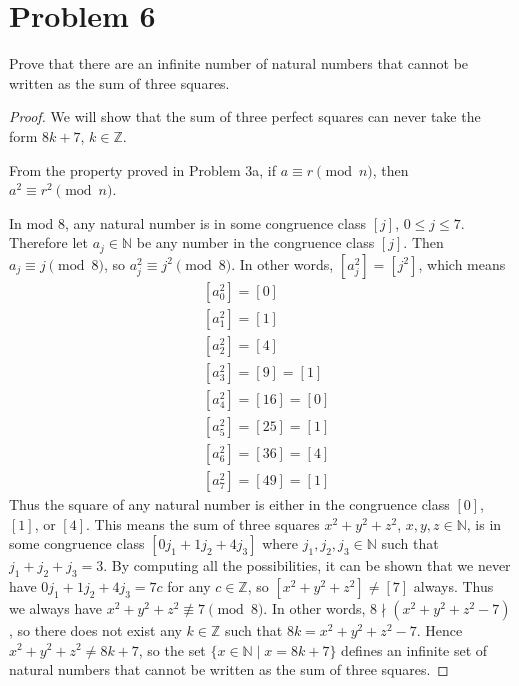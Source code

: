 \documentclass[12pt]{article}
\newcommand{\Z}{\mathbb{Z}}
\theoremstyle{definition}
\begin{document}
\section*{Problem 6}
Prove that there are an infinite number of natural numbers that cannot be written as the sum of
three squares.

\begin{proof}
We will show that the sum of three perfect squares can never take the form \(8k+7\), \(k\in\Z\).

From the property proved in Problem \(3\)a, if \(a\equiv r\pmod{n}\), then \(a^2\equiv r^2\pmod{n}\).

In mod \(8\), any natural number is in some congruence class \([j]\), \(0\leq j\leq 7\). Therefore let \(a_j\in\mathbb{N}\) be any number in the congruence class \([j]\). Then \(a_j\equiv j\pmod{8}\), so \(a_j^2\equiv j^2\pmod{8}\). In other words, \([a_j^2] = [j^2]\), which means
\begin{align*}
    &[a_0^2] = [0]\\
    &[a_1^2] = [1]\\
    &[a_2^2] = [4]\\
    &[a_3^2] = [9] = [1]\\
    &[a_4^2] = [16] = [0]\\
    &[a_5^2] = [25] = [1]\\
    &[a_6^2] = [36] = [4]\\
    &[a_7^2] = [49] = [1]
\end{align*}
Thus the square of any natural number is either in the congruence class \([0]\), \([1]\), or \([4]\). This means the sum of three squares \(x^2 + y^2 + z^2\), \(x,y,z\in\mathbb{N}\), is in some congruence class \([0j_1 + 1j_2 + 4j_3]\) where \(j_1, j_2, j_3\in\mathbb{N}\) such that \(j_1 + j_2 + j_3 = 3\). By computing all the possibilities, it can be shown that we never have \(0j_1 + 1j_2 + 4j_3 = 7c\) for any \(c\in\Z\), so \([x^2 + y^2 + z^2]\neq [7]\) always. Thus we always have \(x^2 + y^2 + z^2 \not\equiv 7\pmod{8}\). In other words, \(8\nmid (x^2 + y^2 + z^2 -7)\), so there does not exist any \(k\in\Z\) such that \(8k = x^2 + y^2 + z^2 - 7\). Hence \(x^2 + y^2 + z^2 \neq 8k+7\), so the set \(\{x\in\mathbb{N}\mid x=8k+7\}\) defines an infinite set of natural numbers that cannot be written as the sum of three squares.
\end{proof}
\end{document}
